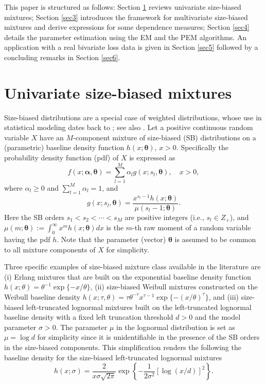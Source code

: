 \documentclass[eng]{csam}
\def\a{\alpha}
\begin{document}
This paper is structured as follows: Section \ref{sec2} reviews univariate size-biased mixtures; Section \ref{sec3} introduces the framework for multivariate size-biased mixtures and derive expressions for some dependence measures; Section \ref{sec4} details the parameter estimation using the EM and the PEM algorithms. An application with a real bivariate loss data is given in Section \ref{sec5} followed by a concluding remarks in Section \ref{sec6}.


\section{Univariate size-biased mixtures}\label{sec2}
Size-biased distributions are a special case of weighted distributions, whose use in statistical modeling dates back to \citet{patil:1978}; see also \citet{gupta1990role}. Let a positive continuous random variable $X$ have an $M$-component mixture of size-biased (SB) distributions on a (parametric) baseline density function $h(x; \bm{\theta}),\, x >0$. Specifically the probability density function (pdf) of $X$ is expressed as
\begin{equation}\label{pdf_marginal}
f(x; \bm{\a}, \bm{\theta}) = \sum_{l = 1}^{M} \a_{l} g(x;s_l, \bm{\theta}),\quad x >0,
\end{equation}
where $\a_{l} \ge 0$ and $\sum_{l = 1}^{M} \a_{l} = 1$, and
\begin{equation}\label{sb_den}
g(x;s_l, \bm{\theta}) = \frac{x^{s_l -1} h(x; \bm{\theta})}{\mu(s_l -1; \bm{\theta})}.
\end{equation}
Here the SB orders $s_1 < s_2 < \cdots < s_{M}$ are positive integers (i.e., $s_l \in Z_+$), and $\mu(m; \bm{\theta}) := \int_0^{\infty} x^m h(x;\bm{\theta}) dx$ is the $m$-th raw moment of a random variable having the pdf $h$. Note that the parameter (vector) $\bm{\theta}$ is assumed to be common to all mixture components of $X$ for simplicity.

Three specific examples of size-biased mixture class available in the literature are (i) Erlang mixtures \citep{leelin2010, willmot2011risk, Verbelen2015} that are built on the exponential baseline density function $h(x;\theta) = \theta^{-1}\exp\{-x/\theta\}$, (ii) size-biased Weibull mixtures \citep{bae2020mixtures} constructed on the Weibull baseline density $h(x;\tau,\theta) = \tau \theta^{-\tau} x^{\tau-1}\exp\{-(x/\theta)^{\tau}\}$, and (iii) size-biased left-truncated lognormal mixtures \citep{bae2024loss} built on the left-truncated lognormal baseline density with a fixed left truncation threshold $d >0$ and the model parameter $\sigma >0$. The parameter $\mu$ in the lognormal distribution is set as $\mu = \log d$ for simplicity since it is unidentifiable in the presence of the SB orders in the size-biased components. This simplification renders the following the baseline density for the size-biased left-truncated lognormal mixtures
\begin{equation*}
h(x;\sigma) = \frac{2}{x\sigma\sqrt{2\pi}}\exp\left\{-\frac{1}{2\sigma^2}\left[\log(x/d)\right]^2\right\}.
\end{equation*}
\end{document}
